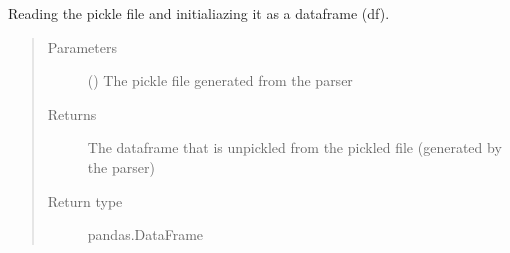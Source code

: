 \documentclass[letterpaper,10pt,openany,oneside,english]{sphinxmanual}
\begin{document}
\begin{fulllineitems}
\label{\detokenize{index:loadPullDataAnalysis.dataXformation.dfFromPkl}}
\sphinxAtStartPar
Reading the pickle file and initialiazing it as a dataframe (df).
\begin{quote}\begin{description}
\item[{Parameters}] \leavevmode
\sphinxAtStartPar
{} () \textendash{} The pickle file generated from the parser

\item[{Returns}] \leavevmode
\sphinxAtStartPar
The dataframe that is unpickled from the pickled file (generated by the parser)

\item[{Return type}] \leavevmode
\sphinxAtStartPar
pandas.DataFrame

\end{description}\end{quote}

\end{fulllineitems}

\end{document}

